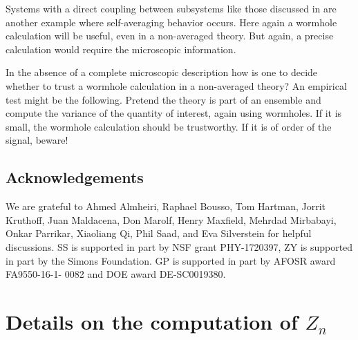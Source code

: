 \documentclass[11pt]{article}
\numberwithin{equation}{section}
\begin{document}
Systems with a direct coupling between subsystems like those  discussed in \cite{Maldacena:2018lmt} are another example where self-averaging behavior occurs.  Here again a wormhole calculation will be  useful, even in a non-averaged theory.  But again, a precise calculation would require the microscopic information.

In the absence of a complete microscopic description how is one to decide whether to trust a wormhole calculation in a non-averaged theory?   An empirical test might be the following.   Pretend the theory is part of an ensemble and compute the variance of the quantity of interest, again using wormholes.  If it is small, the wormhole calculation should be trustworthy.  If it is of order of the signal, beware!




\subsection*{Acknowledgements}
We are grateful to Ahmed Almheiri, Raphael Bousso, Tom Hartman, Jorrit Kruthoff, Juan Maldacena, Don Marolf, Henry Maxfield, Mehrdad Mirbabayi, Onkar Parrikar, Xiaoliang Qi, Phil Saad, and Eva Silverstein for helpful discussions. SS is supported in part by NSF grant PHY-1720397, ZY is supported in part by the Simons Foundation.  GP is supported in part by AFOSR award FA9550-16-1- 0082 and DOE award {DE-SC0019380}.



\appendix

\section{Details on the computation of $Z_n$}\label{app:zn}
\end{document}
